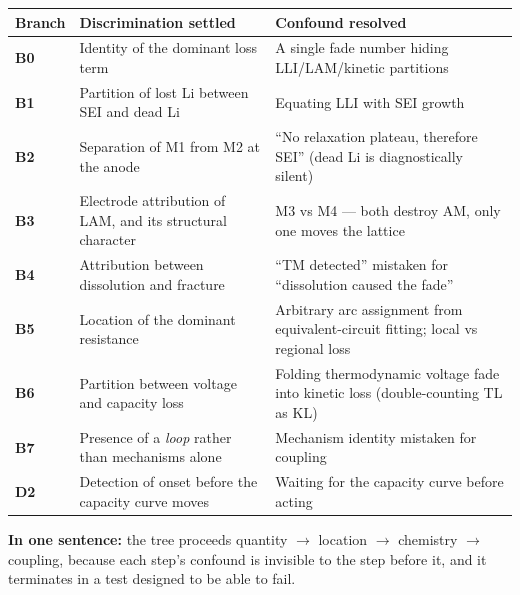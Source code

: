\documentclass[11pt,a4paper]{article}
\renewcommand{\arraystretch}{1.15}
\begin{document}
\begingroup\small
\setlength{\tabcolsep}{3pt}
\renewcommand{\arraystretch}{1.12}
\sloppy
\begin{tabular}{@{}>{\raggedright\arraybackslash}p{}>{\raggedright\arraybackslash}p{}>{\raggedright\arraybackslash}p{}@{}}
\hline
\textbf{Branch} & \textbf{Discrimination settled} & \textbf{Confound resolved} \\ \hline
\textbf{B0} & Identity of the dominant loss term & A single fade number hiding LLI/LAM/kinetic partitions \\
\hline
\textbf{B1} & Partition of lost Li between SEI and dead Li & Equating LLI with SEI growth \\
\hline
\textbf{B2} & Separation of M1 from M2 at the anode & \textquotedblleft{}No relaxation plateau, therefore SEI\textquotedblright{} (dead Li is diagnostically silent) \\
\hline
\textbf{B3} & Electrode attribution of LAM, and its structural character & M3 vs M4 --- both destroy AM, only one moves the lattice \\
\hline
\textbf{B4} & Attribution between dissolution and fracture & \textquotedblleft{}TM detected\textquotedblright{} mistaken for \textquotedblleft{}dissolution caused the fade\textquotedblright{} \\
\hline
\textbf{B5} & Location of the dominant resistance & Arbitrary arc assignment from equivalent-circuit fitting; local vs regional loss \\
\hline
\textbf{B6} & Partition between voltage and capacity loss & Folding thermodynamic voltage fade into kinetic loss (double-counting TL as KL) \\
\hline
\textbf{B7} & Presence of a \emph{loop} rather than mechanisms alone & Mechanism identity mistaken for coupling \\
\hline
\textbf{D2} & Detection of onset before the capacity curve moves & Waiting for the capacity curve before acting \\
\hline
\end{tabular}
\endgroup



\textbf{In one sentence:} the tree proceeds quantity \ensuremath{\rightarrow} location \ensuremath{\rightarrow} chemistry \ensuremath{\rightarrow} coupling, because each step's confound is invisible to the step before it, and it terminates in a test designed to be able to fail.
\end{document}
